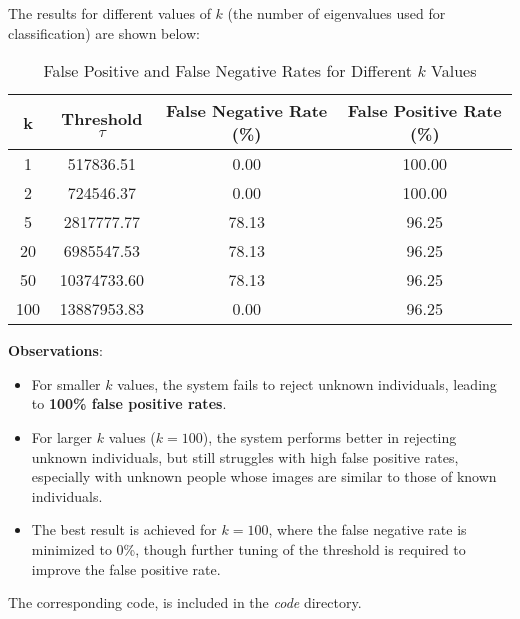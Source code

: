 \documentclass{article}
\begin{document}
\begin{enumerate}
The results for different values of $k$ (the number of eigenvalues used for classification) are shown below:

\begin{table}[h!]
\centering
\begin{tabular}{|c|c|c|c|}
\hline
\textbf{k} & \textbf{Threshold $\tau$} & \textbf{False Negative Rate (\%)} & \textbf{False Positive Rate (\%)} \\
\hline
1   & 517836.51   & 0.00  & 100.00  \\
2   & 724546.37   & 0.00  & 100.00  \\
5   & 2817777.77  & 78.13 & 96.25   \\
20  & 6985547.53  & 78.13 & 96.25   \\
50  & 10374733.60 & 78.13 & 96.25   \\
100 & 13887953.83 & 0.00  & 96.25   \\
\hline
\end{tabular}
\caption{False Positive and False Negative Rates for Different $k$ Values}
\end{table}

\textbf{Observations}:
\begin{itemize}
    \item For smaller $k$ values, the system fails to reject unknown individuals, leading to \textbf{100\% false positive rates}.
    \item For larger $k$ values ($k = 100$), the system performs better in rejecting unknown individuals, but still struggles with high false positive rates, especially with unknown people whose images are similar to those of known individuals.
    \item The best result is achieved for $k = 100$, where the false negative rate is minimized to 0\%, though further tuning of the threshold is required to improve the false positive rate.
\end{itemize} 
The corresponding code, is included in the \emph{code} directory.
\end{enumerate}
\end{document}
